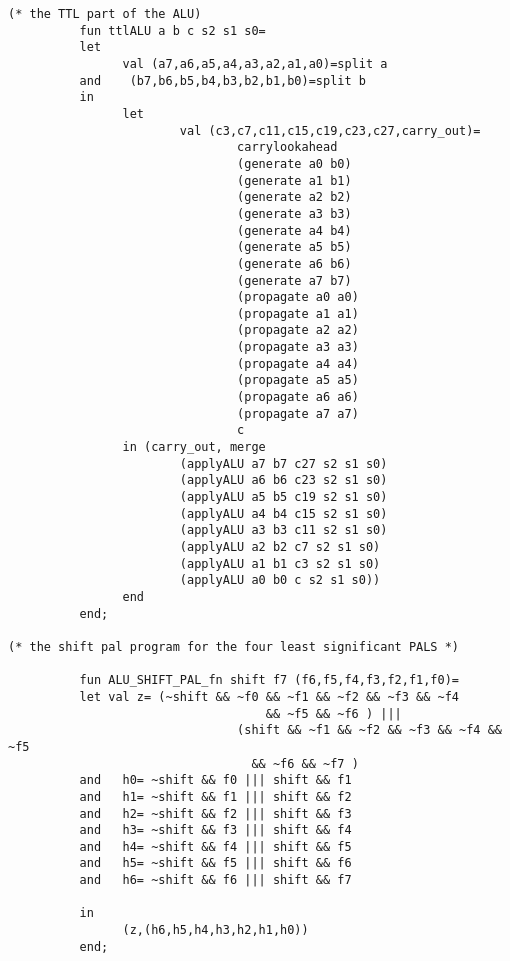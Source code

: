 \begin{verbatim}
(* the TTL part of the ALU)
          fun ttlALU a b c s2 s1 s0=
          let
                val (a7,a6,a5,a4,a3,a2,a1,a0)=split a
          and    (b7,b6,b5,b4,b3,b2,b1,b0)=split b
          in 
                let
                        val (c3,c7,c11,c15,c19,c23,c27,carry_out)=
                                carrylookahead
                                (generate a0 b0)
                                (generate a1 b1)
                                (generate a2 b2)
                                (generate a3 b3)
                                (generate a4 b4)
                                (generate a5 b5)
                                (generate a6 b6)
                                (generate a7 b7)
                                (propagate a0 a0)
                                (propagate a1 a1)
                                (propagate a2 a2)
                                (propagate a3 a3)
                                (propagate a4 a4)
                                (propagate a5 a5)
                                (propagate a6 a6)
                                (propagate a7 a7)
                                c
                in (carry_out, merge 
                        (applyALU a7 b7 c27 s2 s1 s0)
                        (applyALU a6 b6 c23 s2 s1 s0)
                        (applyALU a5 b5 c19 s2 s1 s0)
                        (applyALU a4 b4 c15 s2 s1 s0)
                        (applyALU a3 b3 c11 s2 s1 s0)
                        (applyALU a2 b2 c7 s2 s1 s0)
                        (applyALU a1 b1 c3 s2 s1 s0)
                        (applyALU a0 b0 c s2 s1 s0))
                end
          end;

(* the shift pal program for the four least significant PALS *)

          fun ALU_SHIFT_PAL_fn shift f7 (f6,f5,f4,f3,f2,f1,f0)=
          let val z= (~shift && ~f0 && ~f1 && ~f2 && ~f3 && ~f4
                                  	&& ~f5 && ~f6 ) |||
                                (shift && ~f1 && ~f2 && ~f3 && ~f4 && ~f5
                                  && ~f6 && ~f7 )
          and   h0= ~shift && f0 ||| shift && f1
          and   h1= ~shift && f1 ||| shift && f2
          and   h2= ~shift && f2 ||| shift && f3
          and   h3= ~shift && f3 ||| shift && f4
          and   h4= ~shift && f4 ||| shift && f5
          and   h5= ~shift && f5 ||| shift && f6
          and   h6= ~shift && f6 ||| shift && f7

          in
                (z,(h6,h5,h4,h3,h2,h1,h0))
          end;


\end{verbatim}
